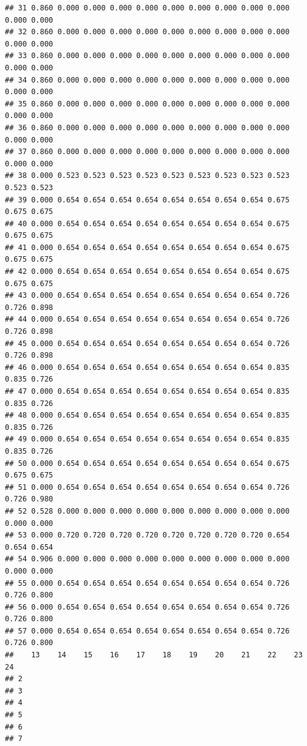 \documentclass[
]{book}
\begin{document}
\begin{verbatim}
## 31 0.860 0.000 0.000 0.000 0.000 0.000 0.000 0.000 0.000 0.000 0.000 0.000
## 32 0.860 0.000 0.000 0.000 0.000 0.000 0.000 0.000 0.000 0.000 0.000 0.000
## 33 0.860 0.000 0.000 0.000 0.000 0.000 0.000 0.000 0.000 0.000 0.000 0.000
## 34 0.860 0.000 0.000 0.000 0.000 0.000 0.000 0.000 0.000 0.000 0.000 0.000
## 35 0.860 0.000 0.000 0.000 0.000 0.000 0.000 0.000 0.000 0.000 0.000 0.000
## 36 0.860 0.000 0.000 0.000 0.000 0.000 0.000 0.000 0.000 0.000 0.000 0.000
## 37 0.860 0.000 0.000 0.000 0.000 0.000 0.000 0.000 0.000 0.000 0.000 0.000
## 38 0.000 0.523 0.523 0.523 0.523 0.523 0.523 0.523 0.523 0.523 0.523 0.523
## 39 0.000 0.654 0.654 0.654 0.654 0.654 0.654 0.654 0.654 0.675 0.675 0.675
## 40 0.000 0.654 0.654 0.654 0.654 0.654 0.654 0.654 0.654 0.675 0.675 0.675
## 41 0.000 0.654 0.654 0.654 0.654 0.654 0.654 0.654 0.654 0.675 0.675 0.675
## 42 0.000 0.654 0.654 0.654 0.654 0.654 0.654 0.654 0.654 0.675 0.675 0.675
## 43 0.000 0.654 0.654 0.654 0.654 0.654 0.654 0.654 0.654 0.726 0.726 0.898
## 44 0.000 0.654 0.654 0.654 0.654 0.654 0.654 0.654 0.654 0.726 0.726 0.898
## 45 0.000 0.654 0.654 0.654 0.654 0.654 0.654 0.654 0.654 0.726 0.726 0.898
## 46 0.000 0.654 0.654 0.654 0.654 0.654 0.654 0.654 0.654 0.835 0.835 0.726
## 47 0.000 0.654 0.654 0.654 0.654 0.654 0.654 0.654 0.654 0.835 0.835 0.726
## 48 0.000 0.654 0.654 0.654 0.654 0.654 0.654 0.654 0.654 0.835 0.835 0.726
## 49 0.000 0.654 0.654 0.654 0.654 0.654 0.654 0.654 0.654 0.835 0.835 0.726
## 50 0.000 0.654 0.654 0.654 0.654 0.654 0.654 0.654 0.654 0.675 0.675 0.675
## 51 0.000 0.654 0.654 0.654 0.654 0.654 0.654 0.654 0.654 0.726 0.726 0.980
## 52 0.528 0.000 0.000 0.000 0.000 0.000 0.000 0.000 0.000 0.000 0.000 0.000
## 53 0.000 0.720 0.720 0.720 0.720 0.720 0.720 0.720 0.720 0.654 0.654 0.654
## 54 0.906 0.000 0.000 0.000 0.000 0.000 0.000 0.000 0.000 0.000 0.000 0.000
## 55 0.000 0.654 0.654 0.654 0.654 0.654 0.654 0.654 0.654 0.726 0.726 0.800
## 56 0.000 0.654 0.654 0.654 0.654 0.654 0.654 0.654 0.654 0.726 0.726 0.800
## 57 0.000 0.654 0.654 0.654 0.654 0.654 0.654 0.654 0.654 0.726 0.726 0.800
##    13    14    15    16    17    18    19    20    21    22    23    24   
## 2                                                                         
## 3                                                                         
## 4                                                                         
## 5                                                                         
## 6                                                                         
## 7                                                                         

\end{verbatim}
\end{document}
